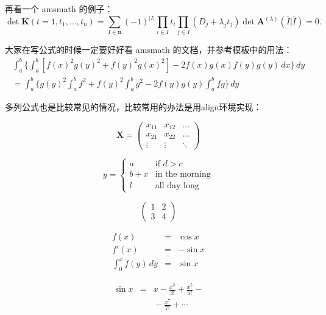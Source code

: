 再看一个 \textsf{amsmath} 的例子：
\newcommand{\envert}[1]{\left\lvert#1\right\rvert} 
\begin{equation}\label{detK2}
\det\mathbf{K}(t=1,t_1,\dots,t_n)=\sum_{I\in\mathbf{n}}(-1)^{\envert{I}}
\prod_{i\in I}t_i\prod_{j\in I}(D_j+\lambda_jt_j)\det\mathbf{A}
^{(\lambda)}(\overline{I}|\overline{I})=0.
\end{equation} 

大家在写公式的时候一定要好好看 \textsf{amsmath} 的文档，并参考模板中的用法：
\begin{multline*}%
\int_a^b\biggl\{\int_a^b[f(x)^2g(y)^2+f(y)^2g(x)^2]
 -2f(x)g(x)f(y)g(y)\,dx\biggr\}\,dy \\
 =\int_a^b\biggl\{g(y)^2\int_a^bf^2+f(y)^2
  \int_a^b g^2-2f(y)g(y)\int_a^b fg\biggr\}\,dy
\end{multline*}

多列公式也是比较常见的情况，比较常用的办法是用align环境实现：

\begin{equation} 
\mathbf{X} = \left(\begin{array}{ccc} 
x_{11} & x_{12} & \ldots \\ 
x_{21} & x_{22} & \ldots \\ 
\vdots & \vdots & \ddots \end{array} \right) 
\end{equation} 

\begin{equation} 
y = \left\{ \begin{array}{ll} 
a & \textrm{if $d>c$}\\ 
b+x & \textrm{in the morning}\\ 
l & \textrm{all day long} 
\end{array} \right. 
\end{equation} 

\begin{equation} 
\left(\begin{array}{c|c} 
1 & 2 \\ 
\hline 3 & 4 \end{array}\right) 
\end{equation}   

\begin{eqnarray}
f(x) & = & \cos x \\ 
f'(x) & = & -\sin x \\ 
\int_{0}^{x} f(y)\,dy & = & \sin x 
\end{eqnarray} 

{\setlength\arraycolsep{2pt} 
\begin{eqnarray} 
\sin x & = & x -\frac{x^{3}}{3!} +\frac{x^{5}}{5!}-{} \nonumber\\ 
	& & {}-\frac{x^{7}}{7!}+{}\cdots 
\end{eqnarray}} 

